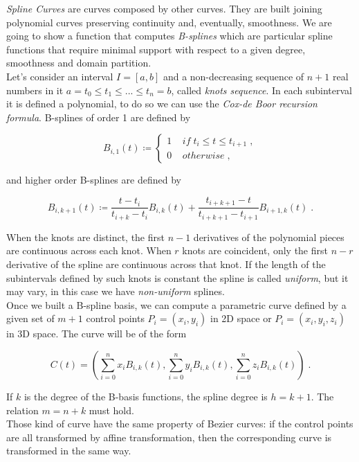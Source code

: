 \documentclass[a4paper,11pt]{article}
\begin{document}
\emph{Spline Curves} are curves composed by other curves. They are built joining polynomial curves preserving continuity and, eventually, smoothness. We are going to show a function that computes \emph{B-splines} which are particular spline functions that require minimal support with respect to a given degree, smoothness and domain partition. \\
Let's consider an interval $I=[a,b]$ and a non-decreasing sequence of $n+1$ real numbers in it $a=t_0 \leq t_1 \leq ... \leq t_n=b$, called \emph{knots sequence}. In each subinterval it is defined a polynomial, to do so we can use the \emph{Cox-de Boor recursion formula}. B-splines of order 1 are defined by

\begin{equation*}
B_{i,1}(t)\coloneqq
\left\{
	\begin{array}{ll}
	1 \;\;\;\; if \; t_i \leq t \leq t_{i+1} \;, \\
	0 \;\;\;\; otherwise \;,
	\end{array}
	\right.
\end{equation*}

and higher order B-splines are defined by

\begin{equation*}
B_{i,k+1}(t)\coloneqq\frac{t-t_i}{t_{i+k}-t_i}B_{i,k}(t)+\frac{t_{i+k+1}-t}{t_{i+k+1}-t_{i+1}}B_{i+1,k}(t) \;.
\end{equation*}

When the knots are distinct, the first $n-1$ derivatives of the polynomial pieces are continuous across each knot. When $r$ knots are coincident, only the first $n-r$ derivative of the spline are continuous across that knot. If the length of the subintervals defined by such knots is constant the spline is called \emph{uniform}, but it may vary, in this case we have \emph{non-uniform} splines. \\
Once we built a B-spline basis, we can compute a parametric curve defined by a given set of $m+1$ control points $P_i=(x_i,y_i)$ in 2D space or $P_i=(x_i,y_i,z_i)$ in 3D space. The curve will be of the form

\begin{equation*}
C(t)=(\sum_{i=0}^n x_iB_{i,k}(t), \sum_{i=0}^n y_iB_{i,k}(t), \sum_{i=0}^n z_iB_{i,k}(t)) \;.
\end{equation*}

If $k$ is the degree of the B-basis functions, the spline degree is $h=k+1$. The relation $m=n+k$ must hold. \\
Those kind of curve have the same property of Bezier curves: if the control points are all transformed by affine transformation, then the corresponding curve is transformed in the same way.
\end{document}
